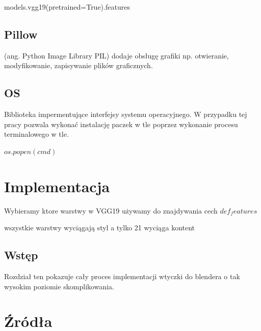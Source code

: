 \documentclass[brudnopis]{xmgr}
\begin{document}
models.vgg19(pretrained=True).features

    \section{Pillow\label{s:dsssl}}
    
    (ang. Python Image Library PIL) dodaje obsługę grafiki np. otwieranie, modyfikowanie, zapisywanie plików graficznych.
    
        \section{OS\label{s:dsssl}}
        
        Biblioteka impermentujące  interfejsy systemu operacyjnego. W przypadku tej pracy pozwala wykonać instalację paczek w tle poprzez wykonanie procesu terminalowego w tle. 

$os.popen(cmd)$

\chapter{Implementacja}

Wybieramy ktore warstwy w VGG19 używamy do znajdywania cech 
$def_features$

wszystkie warstwy wyciągają styl a tylko 21 wyciąga kontent

 \section{Wstęp\label{s:dsssl}}
        
Rozdział ten pokazuje cały proces implementacji wtyczki do blendera o tak wysokim poziomie skomplikowania. 
\chapter{Źródła}
\end{document}
